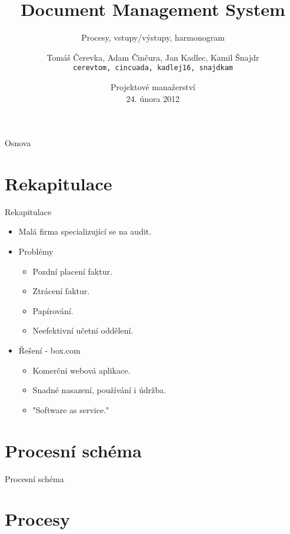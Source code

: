 \documentclass[10pt,xcolor=table]{beamer}
\title[Document Management System]{Document Management System}
\subtitle{Procesy, vstupy/výstupy, harmonogram}
\author[Tomáš Čerevka] {
  Tomáš Čerevka, Adam Činčura, Jan Kadlec, Kamil Šnajdr \\
  {\tt cerevtom, cincuada, kadlej16, snajdkam}
}
\institute[ČVUT FIT] {
  Fakulta informačních technologií \\
  České vysoké učení technické \\
  Praha
}
\date[\today]{
Projektové manažerství \\
{\normalsize 24. února 2012}
}
\begin{document}
\begin{frame}[plain]
  \titlepage
\end{frame}

\begin{frame}{Osnova}{}
	\tableofcontents
\end{frame}

\section{Rekapitulace}

\begin{frame}{Rekapitulace}	
	\begin{itemize}
		\item Malá firma specializující se na audit.
		\item Problémy
			\begin{itemize}
				\item Pozdní placení faktur.
				\item Ztrácení faktur.
				\item Papírování.
				\item Neefektivní učetní oddělení.
			\end{itemize}
		\item Řešení - box.com
			\begin{itemize}
				\item Komerční webová aplikace.
				\item Snadné nasazení, používání i údržba.
				\item "Software as service."
			\end{itemize}
	\end{itemize}	
\end{frame}

\section{Procesní schéma}

\begin{frame}{Procesní schéma}
	\resizebox{10cm}{!}{
		
	}
\end{frame}

\section{Procesy}
\end{document}
